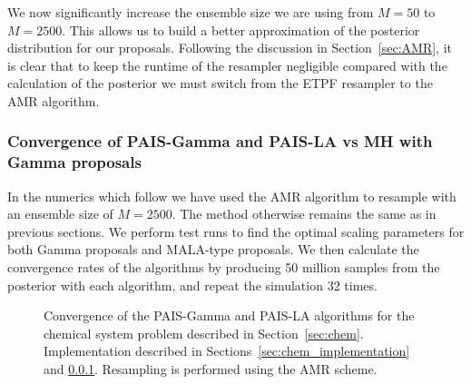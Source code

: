 \documentclass[final]{siamltex}
\begin{document}
We now significantly increase the ensemble size we are using from $M=50$ to $M=2500$. This allows us to build a better approximation of the posterior distribution for our proposals. Following the discussion in Section~\ref{sec:AMR}, it is clear that to keep the runtime of the resampler negligible compared with the calculation of the posterior we must switch from the ETPF resampler to the AMR algorithm.

\subsubsection{Convergence of PAIS-Gamma and PAIS-LA vs MH with Gamma proposals}\label{sec:chem_conv}

In the numerics which follow we have used the AMR algorithm to resample with an ensemble size of $M=2500$. The method otherwise remains the same as in previous sections. We perform test runs to find the optimal scaling parameters for both Gamma proposals and MALA-type proposals. We then calculate the convergence rates of the algorithms by producing 50 million samples from the posterior with each algorithm, and repeat the simulation 32 times.

\begin{figure}[htb]
\centering
{}
\caption{Convergence of the PAIS-Gamma and PAIS-LA algorithms for the chemical system problem described in Section~\ref{sec:chem}. Implementation described in Sections~\ref{sec:chem_implementation} and \ref{sec:chem_conv}. Resampling is performed using the AMR scheme.}
\label{fig:C1_ESS}
\end{figure}
\end{document}
